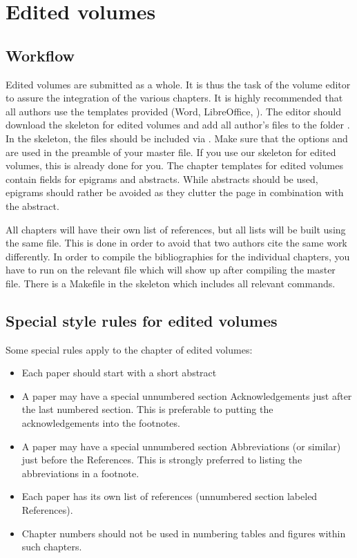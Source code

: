 \chapter{Edited volumes}
\section{Workflow}
Edited volumes are submitted as a whole. It is thus the task of the volume editor to assure the integration of the various chapters. It is highly recommended that all authors use the templates provided (Word, LibreOffice, \latex). The editor should download the skeleton for edited volumes and add all author's files to the folder . In the skeleton, the files should be included via . Make sure that the options  and  are used in the preamble of your master file. If you use our skeleton for edited volumes, this is already done for you. 
The chapter templates for edited volumes contain fields for epigrams and abstracts. While abstracts should be used, epigrams should rather be avoided as they clutter the page in combination with the abstract. 



All chapters will have their own list of references, but all lists will be built using the same {\bibtex} file. This is done in order to avoid that two authors cite the same work differently. In order to compile the bibliographies for the individual chapters, you have to run {\bibtex} on the relevant  file which will show up after compiling the master file. There is a Makefile in the skeleton which includes all relevant commands.
     
\section{Special style rules for edited volumes}
Some special rules apply to the chapter of edited volumes:
\begin{itemize}
\item Each paper should start with a short abstract
\item A paper may have a special unnumbered section Acknowledgements just after the last numbered section. This is preferable to putting the acknowledgements into the footnotes.
\item A paper may have a special unnumbered section Abbreviations (or similar) just before the References. This is strongly preferred to listing the abbreviations in a footnote.
\item Each paper has its own list of references (unnumbered section labeled References).
\item Chapter numbers should not be used in numbering tables and figures within such chapters.
\end{itemize}